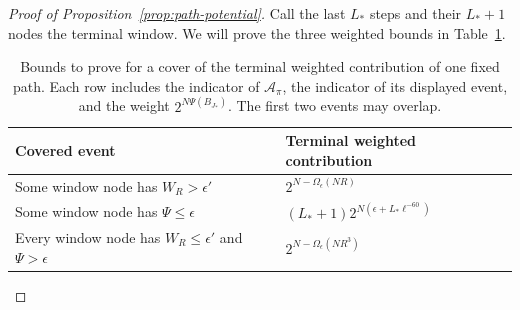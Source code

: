 \begin{proof}[Proof of Proposition~\ref{prop:path-potential}]
Call the last \(L_*\) steps and their \(L_*+1\) nodes the terminal window.
We will prove the three weighted bounds in Table~\ref{tab:path-contributions}.
\begin{table}[ht]
\centering
\renewcommand{\arraystretch}{1.15}
\begin{tabular}{@{}p{}p{}@{}}
\toprule
Covered event & Terminal weighted contribution\\
\midrule
Some window node has \(W_R>\epsilon'\)
 & \(2^{N-\Omega_\epsilon(NR)}\)\\
Some window node has \(\Psi\le\epsilon\)
 & \((L_*+1)2^{N(\epsilon+L_*\ell^{-60})}\)\\
Every window node has \(W_R\le\epsilon'\) and \(\Psi>\epsilon\)
 & \(2^{N-\Omega_\epsilon(NR^3)}\)\\
\bottomrule
\end{tabular}
\caption{Bounds to prove for a cover of the terminal weighted contribution
of one fixed path. Each row includes the indicator of \(\mathcal A_\pi\),
the indicator of its displayed event, and the weight \(2^{N\Psi(B_{J_*})}\).
The first two events may overlap.}
\label{tab:path-contributions}
\end{table}


\end{proof}
